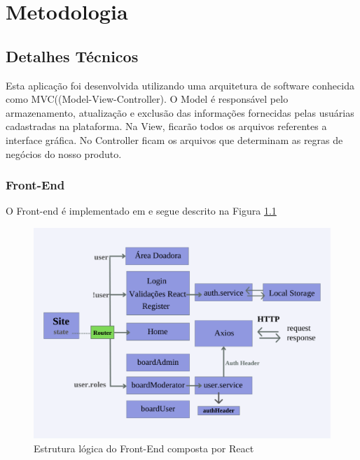 \chapter{Metodologia}
\section{Detalhes Técnicos}
\label{sec:tech}

Esta aplicação foi desenvolvida utilizando uma arquitetura de software conhecida como MVC((Model-View-Controller).
O Model é responsável pelo armazenamento, atualização e exclusão das informações fornecidas pelas usuárias cadastradas na plataforma.
Na View, ficarão todos os arquivos referentes a interface gráfica.
No Controller ficam os arquivos que determinam as regras de negócios do nosso produto.

\subsection{Front-End}
O Front-end é implementado em \cite{Next.Js} e segue descrito na Figura \ref{fig:logicFront}

\begin{figure}[h!]
    \centering
    \includegraphics[width=1.0\textwidth]{Figuras/Frontpdf.pdf}
    \caption{Estrutura lógica do Front-End composta por React}
    \label{fig:logicFront}
\end{figure}

